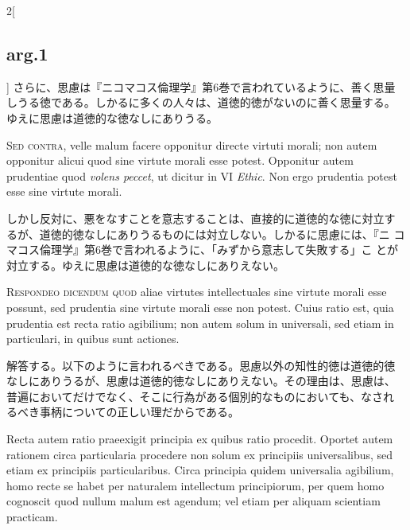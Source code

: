 \documentclass[paper=a4paper,fontsize=10pt,jafontsize=9pt,titlepage]{jlreq}
\begin{document}
\begin{paracol}{2}[\subsection{arg.1}]
さらに、思慮は『ニコマコス倫理学』第6巻で言われているように、善く思量
しうる徳である。しかるに多くの人々は、道徳的徳がないのに善く思量する。
ゆえに思慮は道徳的な徳なしにありうる。

\switchcolumn*[\subsection{s.c.}]

{\scshape Sed contra}, velle malum facere opponitur directe virtuti
morali; non autem opponitur alicui quod sine virtute morali esse
potest. Opponitur autem prudentiae quod {\itshape volens peccet}, ut
dicitur in VI {\itshape Ethic}. Non ergo prudentia potest esse sine
virtute morali.

\switchcolumn

しかし反対に、悪をなすことを意志することは、直接的に道徳的な徳に対立す
るが、道徳的徳なしにありうるものには対立しない。しかるに思慮には、『ニ
コマコス倫理学』第6巻で言われるように、「みずから意志して失敗する」こ
とが対立する。ゆえに思慮は道徳的な徳なしにありえない。


{\scshape Respondeo dicendum quod} aliae virtutes intellectuales sine
virtute morali esse possunt, sed prudentia sine virtute morali esse
non potest. Cuius ratio est, quia prudentia est recta ratio agibilium;
non autem solum in universali, sed etiam in particulari, in quibus
sunt actiones.

\switchcolumn

解答する。以下のように言われるべきである。思慮以外の知性的徳は道徳的徳
なしにありうるが、思慮は道徳的徳なしにありえない。その理由は、思慮は、
普遍においてだけでなく、そこに行為がある個別的なものにおいても、なされ
るべき事柄についての正しい理だからである。

\switchcolumn*

Recta autem ratio praeexigit principia ex quibus ratio
procedit. Oportet autem rationem circa particularia procedere non
solum ex principiis universalibus, sed etiam ex principiis
particularibus. Circa principia quidem universalia agibilium, homo
recte se habet per naturalem intellectum principiorum, per quem homo
cognoscit quod nullum malum est agendum; vel etiam per aliquam
scientiam practicam.

\switchcolumn


\end{paracol}
\end{document}
